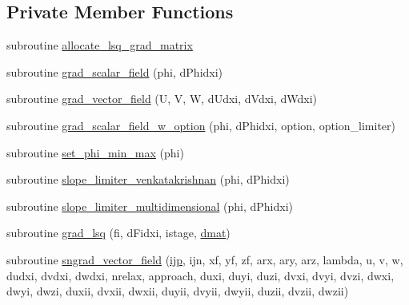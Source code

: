 \subsection*{Private Member Functions}
\begin{DoxyCompactItemize}
\item 
subroutine \hyperlink{classgradients_a74c0ecdda1ac9d450a0a6538359a6f11}{allocate\-\_\-lsq\-\_\-grad\-\_\-matrix}
\item 
subroutine \hyperlink{classgradients_a52798a9b8eaa888cb6254351a92386ef}{grad\-\_\-scalar\-\_\-field} (phi, d\-Phidxi)
\item 
subroutine \hyperlink{classgradients_a1cb60b38f23f9eb2ee50d537db912cfc}{grad\-\_\-vector\-\_\-field} (U, V, W, d\-Udxi, d\-Vdxi, d\-Wdxi)
\item 
subroutine \hyperlink{classgradients_a12593273fc9f5b56e9ddcad0f8945fa7}{grad\-\_\-scalar\-\_\-field\-\_\-w\-\_\-option} (phi, d\-Phidxi, option, option\-\_\-limiter)
\item 
subroutine \hyperlink{classgradients_af5ae74b1fab366ce3167820e0c6c5c3d}{set\-\_\-phi\-\_\-min\-\_\-max} (phi)
\item 
subroutine \hyperlink{classgradients_a19b76f98ae2657d4f6c3710bd2d8d0be}{slope\-\_\-limiter\-\_\-venkatakrishnan} (phi, d\-Phidxi)
\item 
subroutine \hyperlink{classgradients_a5392f6682ac037eae87dbe5f20d1205f}{slope\-\_\-limiter\-\_\-multidimensional} (phi, d\-Phidxi)
\item 
subroutine \hyperlink{classgradients_a38bb77fa9833da1c198aac2e7ea7c946}{grad\-\_\-lsq} (fi, d\-Fidxi, istage, \hyperlink{classgradients_a0417bd090ffd38c01cbcc0d76068dd82}{dmat})
\item 
subroutine \hyperlink{classgradients_a85591b848f22ed6fefebedf8f90e9246}{sngrad\-\_\-vector\-\_\-field} (\hyperlink{CourantNo_8h_accea320a458bb8759c7ece360e05ddf4}{ijp}, ijn, xf, yf, zf, arx, ary, arz, lambda, u, v, w, dudxi, dvdxi, dwdxi, nrelax, approach, duxi, duyi, duzi, dvxi, dvyi, dvzi, dwxi, dwyi, dwzi, duxii, dvxii, dwxii, duyii, dvyii, dwyii, duzii, dvzii, dwzii)
\end{DoxyCompactItemize}


